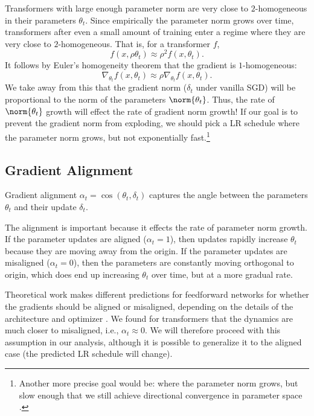 \documentclass{article}
\begin{document}
Transformers with large enough parameter norm are very close to $2$-homogeneous in their parameters $\theta_t$. Since empirically the parameter norm grows over time, transformers after even a small amount of training enter a regime where they are very close to $2$-homogeneous. That is, for a transformer $f$,
\begin{equation*}
    f(x, \rho \theta_t) \approx \rho^2 f(x, \theta_t) .
\end{equation*}
It follows by Euler's homogeneity theorem that the gradient is $1$-homogeneous:
\begin{equation*}
    \nabla_{\theta_t} f(x, \theta_t) \approx \rho \nabla_{\theta_t} f(x, \theta_t) .
\end{equation*}
We take away from this that the gradient norm ($\delta_t$ under vanilla SGD) will be proportional to the norm of the parameters $\norm{\theta_t}$. Thus, the rate of $\norm{\theta_t}$ growth will effect the rate of gradient norm growth! If our goal is to prevent the gradient norm from exploding, we should pick a LR schedule where the parameter norm grows, but not exponentially fast.\footnote{Another more precise goal would be: where the parameter norm grows, but slow enough that we still achieve directional convergence in parameter space \citep{ji2020directional}.}

\subsection{Gradient Alignment}

Gradient alignment $\alpha_t = \cos(\theta_t, \delta_t)$ captures the angle between the parameters $\theta_t$ and their update $\delta_t$.

The alignment is important because it effects the rate of parameter norm growth. If the parameter updates are aligned ($\alpha_t = 1$), then updates rapidly increase $\theta_t$ because they are moving away from the origin. If the parameter updates are misaligned ($\alpha_t = 0$), then the parameters are constantly moving orthogonal to origin, which does end up increasing $\theta_t$ over time, but at a more gradual rate.

Theoretical work makes different predictions for feedforward networks for whether the gradients should be aligned or misaligned, depending on the details of the architecture and optimizer \citep{li2019exponential,ji2020directional}. We found for transformers that the dynamics are much closer to misaligned, i.e., $\alpha_t \approx 0$. We will therefore proceed with this assumption in our analysis, although it is possible to generalize it to the aligned case (the predicted LR schedule will change).
\end{document}
